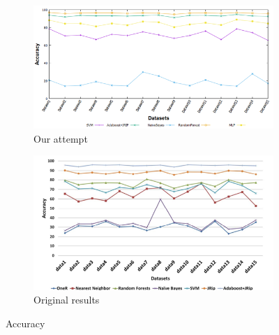 \begin{figure}[H]
    \centering
    \begin{subfigure}[t]{0.5\textwidth}
        \includegraphics[width=\linewidth]{images/weka_accuracy.png}
        \caption{Our attempt}
    \end{subfigure}%
    \begin{subfigure}[t]{0.5\textwidth}
        \includegraphics[width=\linewidth]{images/weka_accuracy_cite.png}
        \caption{Original results \cite{borges_hink_machine_2014-1}}
    \end{subfigure}
    \caption{Accuracy}
    \label{fig:weka_acc}
\end{figure}

